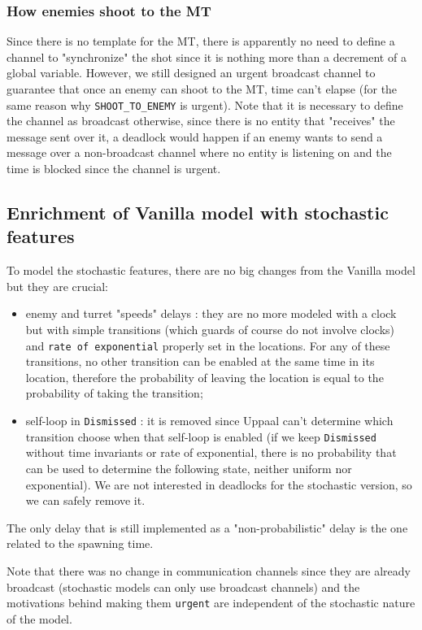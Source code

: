 \documentclass[
10pt, %
a4paper, %
oneside, %
headinclude,footinclude, %
BCOR5mm, %
]{scrartcl}
\begin{document}
			\subsubsection{How enemies shoot to the MT}
				Since there is no template for the MT, there is apparently no need to define a channel to "synchronize" the shot since it is nothing more than a decrement of a global variable. However, we still designed an urgent broadcast channel to guarantee that once an enemy can shoot to the MT, time can't elapse (for the same reason why \texttt{SHOOT\_TO\_ENEMY} is urgent). Note that it is necessary to define the channel as broadcast otherwise, since there is no entity that "receives" the message sent over it, a deadlock would happen if an enemy wants to send a message over a non-broadcast channel where no entity is listening on and the time is blocked since the channel is urgent.
		\subsection{Enrichment of Vanilla model with stochastic features}
			To model the stochastic features, there are no big changes from the Vanilla model but they are crucial:
			\begin{itemize}
				\item enemy and turret "speeds" delays : they are no more modeled with a clock but with simple transitions (which guards of course do not involve clocks) and \texttt{rate of exponential} properly set in the locations. For any of these transitions, no other transition can be enabled at the same time in its location, therefore the probability of leaving the location is equal to the probability of taking the transition;
				\item self-loop in \texttt{Dismissed} : it is removed since Uppaal can't determine which transition choose when that self-loop is enabled (if we keep \texttt{Dismissed} without time invariants or rate of exponential, there is no probability that can be used to determine the following state, neither uniform nor exponential). We are not interested in deadlocks for the stochastic version, so we can safely remove it.
			\end{itemize}
			The only delay that is still implemented as a "non-probabilistic" delay is the one related to the spawning time.
			
			Note that there was no change in communication channels since they are already broadcast (stochastic models can only use broadcast channels) and the motivations behind making them \texttt{urgent} are independent of the stochastic nature of the model.
\end{document}
